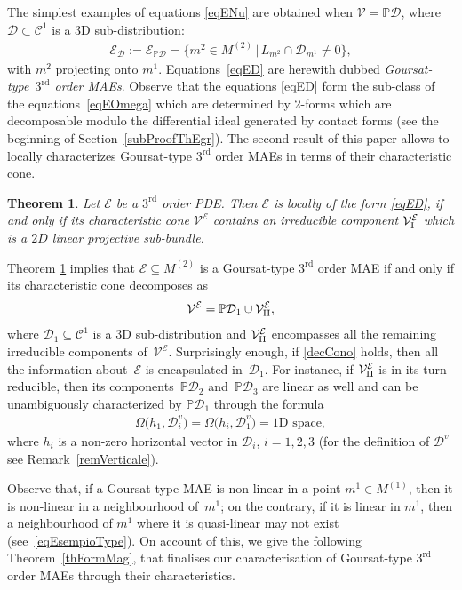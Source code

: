 \documentclass[10pt,a4paper]{amsart}
\newcommand{\C}{\mathcal{C}}
\newcommand{\D}{\mathcal{D}}
\newcommand{\M}{\mathcal{V}}
\newcommand{\MM}{\mathcal{V}_{\textrm{\normalfont I}}}
\newcommand{\MMM}{\mathcal{V}_{\textrm{\normalfont II}}}
\newcommand{\E}{\mathcal{E}}
\renewcommand{\P}{\mathbb{P}}
\newcommand{\Rd}{^\textrm{rd}}
\numberwithin{equation}{section}
\newtheorem{Theorem}{Theorem}[section]
\begin{document}
The simplest examples of equations \eqref{eqENu} are obtained when $\M=\P\D$, where $\D \subset \C^1$ is a 3D sub-distribution:
 \begin{gather}\label{eqED}
\E_{\D }:=\E_{\P\D }=\big\{ m^2\in M^{(2)}\,|\, L_{m^2}\cap\D_{m^1} \neq 0 \big\},
\end{gather}
with $m^2$ projecting onto $m^1$. Equations~\eqref{eqED} are herewith dubbed \emph{Goursat-type~$3\Rd$ order MAEs}.
Observe that the equations \eqref{eqED} form the sub-class of the equations~\eqref{eqEOmega} which are determined by 2-forms which are decomposable modulo the dif\/ferential ideal generated by contact forms (see the beginning of Section~\ref{subProofThEgr}).
The second result of this paper allows to locally characterizes Goursat-type $3\Rd$ order MAEs in terms of their characteristic cone.

\begin{Theorem}\label{thEgr}
Let $\E$ be a $3\Rd$ order PDE. Then $\E$ is locally of the form \eqref{eqED}, if and only if its characteristic cone $\M^\E$ contains an irreducible component $\MM^\E$ which is a $2D$ linear projective sub-bundle.
\end{Theorem}

Theorem \ref{thEgr}
implies that $\E\subseteq M^{(2)}$ is a Goursat-type $3\Rd$ order MAE if and only if its characteristic cone decomposes as
\begin{gather}\label{decCono}
 \M^\E= \P\D_1\cup\MMM^\E,
\end{gather}
where $\D_1\subseteq \C^1$ is a 3D sub-distribution and $\MMM^\E$ encompasses all the remaining irreducible components of~$\M^\E$. Surprisingly enough, if \eqref{decCono} holds, then all the information about~$\E$ is encapsulated in~$\D_1$.
For instance, if $\MMM^\E$ is in its turn reducible, then its components~$\P\D_2$ and~$\P\D_3$ are linear as well and can be unambiguously characterized by $\P\D_1$ through the formula
 \begin{gather}\label{eqFormulaMagica}
\Omega\big(h_1,\D_i^v\big)=\Omega\big(h_i,\D_1^v\big)=\textrm{1D space},
\end{gather}
where $h_i$ is a non-zero horizontal vector in $\D_i$, $i=1,2,3$ (for the def\/inition of $\D^v$ see Remark~\ref{remVerticale}).

Observe that, if a Goursat-type MAE is non-linear in a point $m^1\in M^{(1)}$, then it is non-linear in a neighbourhood of~$m^1$; on the contrary, if it is linear in $m^1$, then a neighbourhood of $m^1$ where it is quasi-linear may not exist (see~\eqref{eqEsempioType}). On account of this, we give the following Theorem~\ref{thFormMag}, that f\/inalises our characterisation of Goursat-type $3\Rd$ order MAEs through their characteristics.
\end{document}
